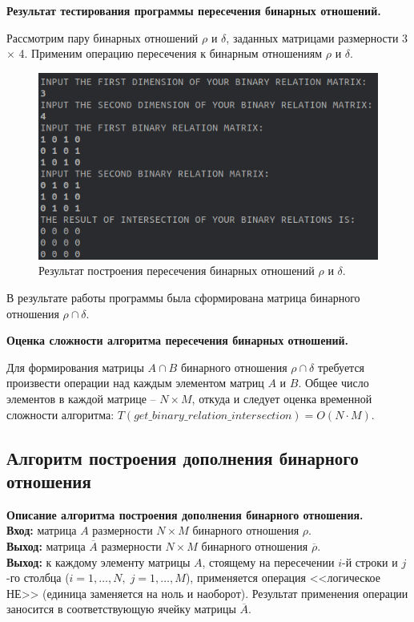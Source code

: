 \documentclass[spec, och, otchet, hidelinks]{SCWorks}
\newcommand{\tbf}[1]{\textbf{#1}}
\begin{document}
\par \tbf{Результат тестирования программы пересечения бинарных отношений.}
\par Рассмотрим пару бинарных отношений $\rho$ и $\delta$, заданных матрицами
размерности 3 $\times$ 4. Применим операцию пересечения к бинарным отношениям
$\rho$ и $\delta$.
\begin{figure}[h]
  \center\includegraphics[scale=0.7]{binary_relation_intersection.png}
  \caption{Результат построения пересечения бинарных отношений $\rho$ и $\delta$.}
\end{figure}

В результате работы программы была сформирована матрица бинарного отношения
$\rho \cap \delta$. \\

\par \tbf{Оценка сложности алгоритма пересечения бинарных отношений.}

\par Для формирования матрицы $A \cap B$ бинарного отношения $\rho \cap \delta$
требуется произвести операции над каждым элементом матриц $A$ и $B$. Общее число
элементов в каждой матрице -- $N \times M$, откуда и следует оценка временной
сложности алгоритма: $T(get\_binary\_relation\_intersection) = O(N \cdot M)$.

\newpage

\subsection{Алгоритм построения дополнения бинарного отношения}
\par \tbf{Описание алгоритма построения дополнения бинарного отношения.} \\
\tbf{Вход:} матрица $A$ размерности $N \times M$ бинарного отношения $\rho$. \\
\tbf{Выход:} матрица $\overline A$ размерности $N \times M$ бинарного отношения
$\overline \rho$. \\
\tbf{Выход:} к каждому элементу матрицы $A$, стоящему на пересечении $i$-й
строки и $j$-го столбца ($i = 1,\dots,N, \; j = 1,\dots,M$), применяется
операция <<логическое НЕ>> (единица заменяется на ноль и наоборот). Результат
применения операции заносится в соответствующую ячейку матрицы $\overline A$. \\
\end{document}
